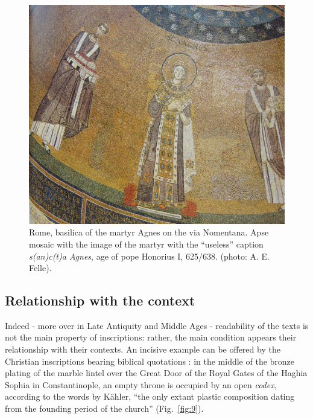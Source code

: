 \documentclass[amsthm,ebook]{saparticle}
\begin{document}
\begin{figure}[!hbp]
\centering
 \includegraphics[width=\columnwidth]{FelleVisualFeaturesofinscriptionsEAGLE2016FullPaper-img011.jpg}
\caption{Rome, basilica of the martyr Agnes on the via Nomentana. Apse mosaic with the image of the martyr with the
``useless'' caption  \emph{s(an)c(t)a Agnes}, age of pope Honorius I, 625/638. (photo: A. E. Felle).}
\label{fig:8}
\end{figure}













\subsection{Relationship with the context}

\noindent Indeed - more over in Late Antiquity and Middle Ages - readability of the texts is not the main property of
inscriptions: rather, the main condition appears their relationship with their contexts. An incisive example can be
offered by the Christian inscriptions bearing biblical quotations \citep{felle_biblia_2006}: in the middle of the bronze
plating of the marble lintel over the Great Door of the Royal Gates of the Haghia Sophia in Constantinople, an empty
throne is occupied by an open \emph{codex}, according to the words by Kähler, ``the only extant plastic
composition dating from the founding period of the church'' \citep[29-30; 32][taff. 22; 62]{kahler_hagia_1967}
(Fig.~\ref{fig:9}).
\end{document}
